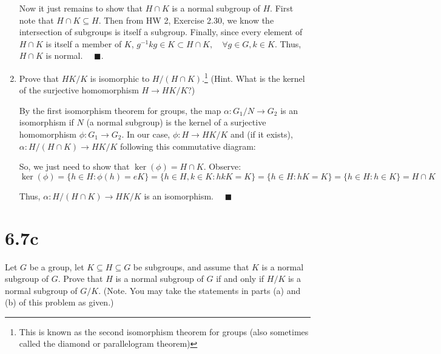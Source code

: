 \documentclass[12pt]{article}
\newcommand{\qed}{\quad \blacksquare}
\begin{document}
\begin{enumerate}[label=(\alph*)]
            Now it just remains to show that $H \cap K$ is a normal subgroup of $H$. First note that $H \cap K \subseteq H$. Then from HW 2, Exercise 2.30, we know the intersection of subgroups is itself a subgroup. Finally, since every element of $H\cap K$ is itself a member of $K$, $g^{-1}kg \in K \subset H \cap K, \quad \forall g \in G, k \in K$. Thus, $H \cap K$ is normal. $\qed$. 
        \color{black}

    \item Prove that $HK/K$ is isomorphic to $H/(H \cap K)$.\footnote{This is known as the second isomorphism theorem for groups (also sometimes called the diamond or parallelogram
    theorem)} (Hint. What is the kernel of the surjective homomorphism $H \to HK/K$?)

        \color{blue}
            By the first isomorphism theorem for groups, the map $\alpha: G_1/N \to G_2$ is an isomorphism if $N$ (a normal subgroup) is the kernel of a surjective homomorphism $\phi: G_1 \to G_2$. In our case, $\phi: H \to HK/K$ and (if it exists), $\alpha: H/(H\cap K) \to HK/K$ following this commutative diagram:
            
            \begin{center}
            \end{center}

            So, we just need to show that $\ker(\phi) = H\cap K$. Observe:
            \[\ker(\phi) = \{h \in H: \phi(h) = eK\} = \{h \in H, k \in K: hkK = K\} = \{h\in H: hK = K\} = \{h \in H: h \in K\} = H \cap K\] 

            Thus, $\alpha: H/(H\cap K) \to HK/K$ is an isomorphism. $\qed$ 
        \color{black}
\end{enumerate}

\pagebreak

\section*{6.7c}
Let $G$ be a group, let $K \subseteq H \subseteq G$ be subgroups, and assume that $K$ is a
normal subgroup of $G$. Prove that $H$ is a normal subgroup of $G$ if and only if $H/K$ is a normal subgroup of $G/K$. (Note. You may take the statements in parts (a) and (b) of this problem as given.)
\end{document}
